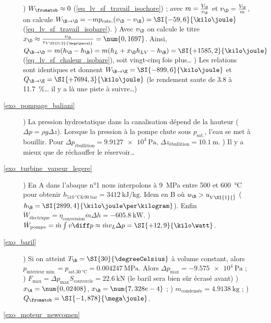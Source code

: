 \begin{description}
			) $W_\fromatob \approx 0$ (\ref{eq_lv_sf_travail_isochore}) ; avec $m = \frac{V_\B}{v_\B}$ et $v_\D = \frac{V_\D}{m}$, on calcule $W_{\B \to \D} = - m p_\text{cste.} (v_\D - v_\B) = \SI{-59,6}{\kilo\joule}$ (\ref{eq_lv_sf_travail_isobare}).
			) Avec $v_\D$ on calcule le titre $x_\D \approx \frac{v_\D}{v_{V \SI{0,2}{\mega\pascal}}} = \num{0,1697}$. 
				Ainsi, ${Q}_{\B \to \D} = m (h_\D - h_\B) = m (h_L + x_\D h_{LV} - h_\B) = \SI{+1585,2}{\kilo\joule}$ (\ref{eq_lv_sf_chaleur_isobare}), soit vingt-cinq fois plus…
			) Les relations sont identiques et donnent ${W}_{\B \to \E} = \SI{-899,6}{\kilo\joule}$ et ${Q}_{\B \to \E} = \SI{+7694,3}{\kilo\joule}$ (le rendement saute de \num{3,8} à \SI{11,7}{\percent}… il y a là une piste à suivre…)
	\item [\ref{exo_pompage_baliani}] 
			) La pression hydrostatique dans la canalisation dépend de la hauteur ($\Delta p = \rho g \Delta z$). Lorsque la pression à la pompe chute sous $p_\text{sat.}$, l’eau se met à bouillir. Pour $\Delta p_\text{ébullition} = \SI{9,9127e4}{\pascal}$, $\Delta z_\text{ébullition} = \SI{10,1}{\metre}$. 
			) Il y a mieux que de réchauffer le réservoir…
	\item [\ref{exo_turbine_vapeur_legere}] 
			) En A dans l’abaque n°1 nous interpolons à \SI{9}{\mega\pascal} entre \num{500} et \SI{600}{\degreeCelsius} pour obtenir $h_{\SI{510}{\degreeCelsius} \& \SI{90}{\bar}} = \SI{3412}{\kilo\joule\per\kilogram}$. 
				Idem en B où $u_\B > u_{V \SI{1}{\bar}}$ ($h_\B = \SI{2899,4}{\kilo\joule\per\kilogram}$). 
				Enfin $\dot{W}_\text{électrique} = \eta_\text{conversion} \dot m \Delta h = \SI{-605,8}{\kilo\watt}$.
			) $\dot{W}_\text{pompe} = \dot m \int v \diff p \approx \dot m v_L \Delta p = \SI{+12,9}{\kilo\watt}$.
	\item [\ref{exo_baril}] 
			) Si on atteint $T_\B = \SI{30}{\degreeCelsius}$ à volume constant, alors $p_\text{intérieur min.} = p_{\text{sat.} \SI{30}{\degreeCelsius}} = \SI{0,004247}{\mega\pascal}$. Alors  $\Delta p_\text{max} = \SI{-9,575e4}{\pascal}$ ;
					\tab{}) $F_\text{max} = \Delta p_\text{max} S_\text{couvercle} = \SI{22,6}{\kilo\newton}$ (le baril sera bien sûr écrasé avant)
					) $x_\A = \num{0,02408}$, $x_\B = \num{7,328e-4}$ ;
					) $m_\text{condensée} = \SI{4,9138}{\kilogram}$ ;
					) ${Q}_\fromatob = \SI{-1,878}{\mega\joule}$.
	\item [\ref{exo_moteur_newcomen}]

\end{description}
